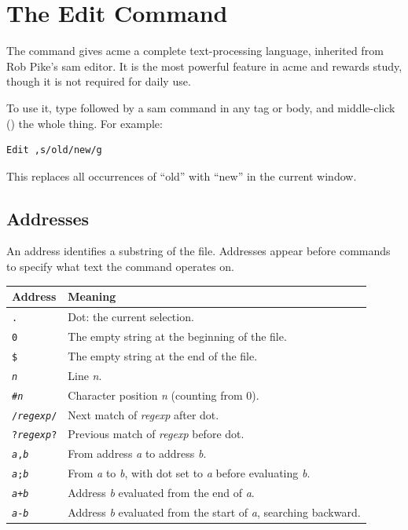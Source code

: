 \chapter{The Edit Command}
\label{ch:edit}


The  command gives acme a complete text-processing language,
inherited from Rob Pike's sam editor.  It is the most powerful feature
in acme and rewards study, though it is not required for daily use.

To use it, type  followed by a sam command in any tag or
body, and middle-click () the whole thing.  For example:

\begin{Verbatim}[frame=single]
Edit ,s/old/new/g
\end{Verbatim}

\noindent
This replaces all occurrences of ``old'' with ``new'' in the current
window.

\section{Addresses}
\label{sec:addresses}


An address identifies a substring of the file.  Addresses appear before
commands to specify what text the command operates on.

\begin{longtable}{@{}lp{3.5in}@{}}
\toprule
Address & Meaning \\
\midrule
\endhead
\texttt{.} & Dot: the current selection. \\
\texttt{0} & The empty string at the beginning of the file. \\
\texttt{\$} & The empty string at the end of the file. \\
\texttt{\textit{n}} & Line \textit{n}. \\
\texttt{\#\textit{n}} & Character position \textit{n} (counting from 0). \\
\texttt{/\textit{regexp}/} & Next match of \textit{regexp} after dot. \\
\texttt{?\textit{regexp}?} & Previous match of \textit{regexp} before dot. \\
\texttt{\textit{a},\textit{b}} & From address \textit{a} to address \textit{b}. \\
\texttt{\textit{a};\textit{b}} & From \textit{a} to \textit{b}, with dot set to \textit{a}
  before evaluating \textit{b}. \\
\texttt{\textit{a}+\textit{b}} & Address \textit{b} evaluated from the end of \textit{a}. \\
\texttt{\textit{a}-\textit{b}} & Address \textit{b} evaluated from the start of \textit{a},
  searching backward. \\
\bottomrule
\end{longtable}


